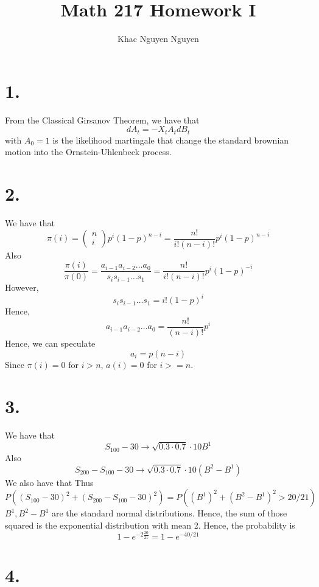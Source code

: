 \documentclass[11pt]{article}
\title{\textbf{Math 217 Homework I}}
\author{Khac Nguyen Nguyen}
\date{}
\begin{document}
\section*{1.}
From the Classical Girsanov Theorem, we have that 
\[
    dA_t = -X_tA_tdB_t    
\]
with $A_0 = 1$ is the likelihood martingale that change the standard brownian motion into the Ornstein-Uhlenbeck process.
\newpage
\section*{2.}
We have that 
\[
    \pi(i) = 
    \begin{pmatrix}
        n \\
        i
    \end{pmatrix}
    p^i (1-p)^{n-i} 
    = \frac{n!}{i!(n-i)!}
    p^i (1-p)^{n-i}
\]
Also
\[
    \frac{\pi(i)}{\pi(0)} = \frac{a_{i-1}a_{i-2}\hdots a_0}{s_i s_{i-1} \hdots s_1} = \frac{n!}{i!(n-i)!}p^i(1-p)^{-i}     
\]
However, 
\[
    s_i s_{i-1} \hdots s_1 = i! (1-p)^i    
\]
Hence, 
\[
    a_{i-1}a_{i-2} \hdots a_0 = \frac{n!}{(n-i)!}p^i    
\]
Hence, we can speculate 
\[
    a_i = p (n-i) 
\]
Since $\pi(i) = 0$ for $i > n$, $a(i) = 0$ for $i>=n$.
\newpage
\section*{3.}
We have that 
\[
    S_{100} - 30 \to \sqrt{0.3 \cdot 0.7} \cdot 10 B^1
\]
Also
\[
    S_{200} - S_{100} - 30 \to \sqrt{0.3 \cdot 0.7} \cdot 10 (B^2 - B^1)
\]
We also have that 
Thus 
\[
    P((S_{100}-30)^2 + (S_{200} - S_{100} -30)^2) = P((B^1)^2 + (B^2-B^1)^2 > 20/21) 
\]
$B^1, B^2-B^1$ are the standard normal distributions. Hence, the sum of those squared is the exponential distribution with mean 2.
Hence, the probability is 
\[
    1-e^{-2\frac{20}{21}} = 1-e^{-40/21}     
\]

\newpage
\section*{4.}
\end{document}
